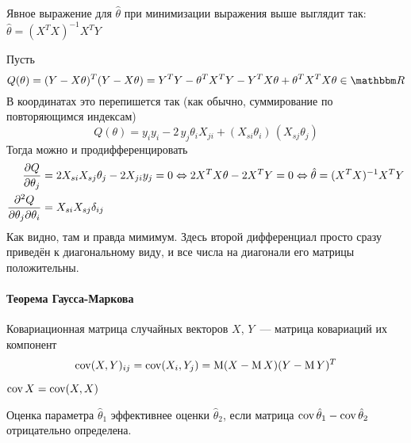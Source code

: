 \documentclass[12pt,timbord]{../../../notes}
\begin{document}
\begin{prop}\label{prop:stat::reg::form}
  Явное выражение для $\hat\theta$ при минимизации выражения выше выглядит так: 
  $\hat\theta = (X^TX)^{-1} X^T Y$
\end{prop}
\begin{itlproof}
  Пусть \[
    Q(\theta) = (Y-X\theta)^T(Y-X\theta) = Y^T Y - \theta^T X^T Y - Y^T X \theta + 
    \theta^T X^T X \theta  \in \R
  \]
  В координатах это перепишется так (как обычно, суммирование по повторяющимся индексам) \[
    Q(\theta) = y_i y_i - 2\,y_j \theta_i X_{ji}  + (X_{si} \theta_i)\,(X_{sj} \theta_j)
  \]
  Тогда можно и продифференцировать
  \begin{align*}
    \frac{\partial Q}{\partial \theta_j}&= 2 X_{si} X_{sj} \theta_j - 2 X_{ji} y_j = 0 \Leftrightarrow 
    2 X^T X \theta - 2 X^T Y = 0 \Leftrightarrow \hat\theta = (X^T X)^{-1} X^T Y \\
    \frac{\partial^2 Q}{\partial \theta_j \partial \theta_i} &= X_{si} X_{sj} \delta_{ij}
  \end{align*}
  Как видно, там и правда мимимум. Здесь второй дифференциал просто сразу приведён к
  диагональному виду, и все числа на диагонали его матрицы положительны.
\end{itlproof}

\paragraph{Теорема Гаусса-Маркова}
\label{par:stat::gausmark}
\begin{defn}\label{defn:stat::reg::cov2}
  Ковариационная матрица случайных векторов $X$, $Y$~--- матрица ковариаций их компонент
  \[
    \operatorname{cov} (X,Y)_{ij} = \operatorname{cov} (X_i, Y_j) = \operatorname{M} (X-\operatorname{M} X) (Y - \operatorname{M} Y)^T
  \]
\end{defn}
\begin{defn}\label{defn:stat::reg::cov}
  $\operatorname{cov} X = \operatorname{cov} (X,X)$
\end{defn}

\begin{defn}\label{defn:stat::reg::eff}
  Оценка параметра $\hat\theta_1$ эффективнее оценки $\hat\theta_2$, если матрица $\operatorname{cov}
  \hat\theta_1 - \operatorname{cov} \hat\theta_2$ отрицательно определена.
\end{defn}
\end{document}
